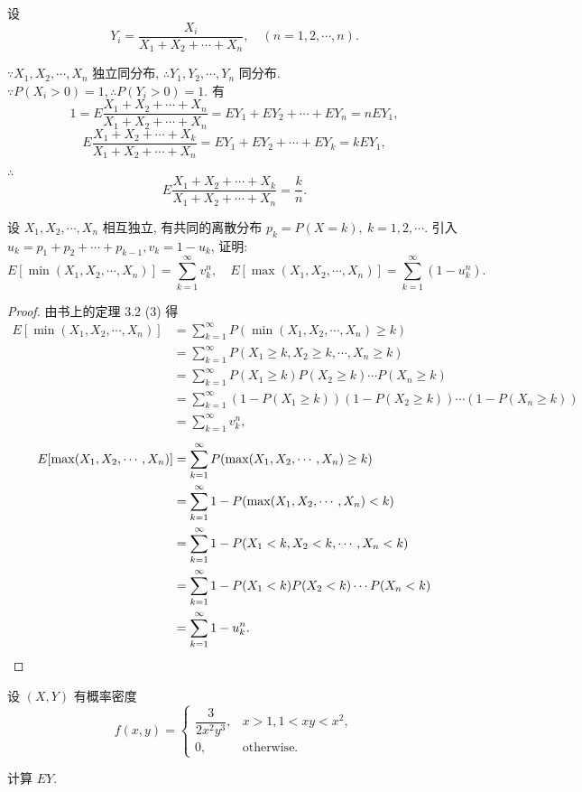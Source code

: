 \documentclass[color=black,device=normal,lang=cn]{elegantnote}
\numberwithin{equation}{section}
\theoremstyle{plain}
\numberwithin{exercise}{exsection}
\begin{document}
\begin{solution}
    设
    \[Y_i=\dfrac{X_i}{X_1+X_2+\cdots+X_n},\quad (n=1,2,\cdots,n).\]
    
    $\because X_1,X_2,\cdots,X_n$ 独立同分布, $\therefore Y_1,Y_2,\cdots,Y_n$ 同分布. $\because P(X_i>0)=1,\therefore P(Y_i>0)=1$. 有
    \[1=E\dfrac{X_1+X_2+\cdots+X_n}{X_1+X_2+\cdots+X_n}=EY_1+EY_2+\cdots+EY_n=nEY_1,\]
    \[E\dfrac{X_1+X_2+\cdots+X_k}{X_1+X_2+\cdots+X_n}=EY_1+EY_2+\cdots+EY_k=kEY_1,\]

    $\therefore$
    \[E\dfrac{X_1+X_2+\cdots+X_k}{X_1+X_2+\cdots+X_n}=\dfrac{k}{n}.\]
\end{solution}
\addtocounter{exercise}{2}
\begin{exercise}%
    设 $X_1,X_2,\cdots,X_n$ 相互独立, 有共同的离散分布 $p_k=P(X=k),\ k=1,2,\cdots$. 引入 $u_k=p_1+p_2+\cdots+p_{k-1},v_k=1-u_k$, 证明:
    \[E[\min(X_1,X_2,\cdots,X_n)]=\sum\limits_{k=1}^\infty v_k^n,\quad E[\max(X_1,X_2,\cdots,X_n)]=\sum\limits_{k=1}^\infty(1-u_k^n).\]
\end{exercise}
\begin{proof}
    由书上的定理 3.2 (3) 得
    \begin{align*}
        E[\min(X_1,X_2,\cdots,X_n)] & =\sum\limits_{k=1}^\infty P(\min(X_1,X_2,\cdots,X_n)\geq k) \\
        & =\sum\limits_{k=1}^\infty P(X_1\geq k,X_2\geq k,\cdots,X_n\geq k) \\
        & =\sum\limits_{k=1}^\infty P(X_1\geq k)P(X_2\geq k)\cdots P(X_n\geq k) \\
        & =\sum\limits_{k=1}^\infty (1-P(X_1\geq k))(1-P(X_2\geq k))\cdots(1-P(X_n\geq k)) \\
        & =\sum\limits_{k=1}^\infty v_k^n,
    \end{align*}
    \begin{align*}
        E[\max(X_1,X_2,\cdots,X_n)] & =\sum\limits_{k=1}^\infty P(\max(X_1,X_2,\cdots,X_n)\geq k) \\
        & =\sum\limits_{k=1}^\infty1-P(\max(X_1,X_2,\cdots,X_n)<k) \\
        & =\sum\limits_{k=1}^\infty1-P(X_1<k,X_2<k,\cdots,X_n<k) \\
        & =\sum\limits_{k=1}^\infty1-P(X_1<k)P(X_2<k)\cdots P(X_n<k) \\
        & =\sum\limits_{k=1}^\infty1-u_k^n.\qedhere
    \end{align*}
\end{proof}
\begin{exercise}[1]%
    设 $(X,Y)$ 有概率密度
    \[f(x,y)=\begin{cases}
        \dfrac{3}{2x^2y^3}, & x>1,1<xy<x^2, \\[6pt]
        0, & \text{otherwise}.
    \end{cases}\]

    计算 $EY$.
\end{exercise}
\end{document}
